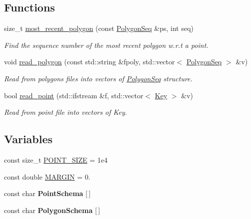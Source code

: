 \subsection*{Functions}
\begin{DoxyCompactItemize}
\item 
size\-\_\-t \hyperlink{namespaceSigSpatial2013_a317bfe5f97ff810889aab1765f916f49}{most\-\_\-recent\-\_\-polygon} (const \hyperlink{structSigSpatial2013_1_1PolygonSeq}{Polygon\-Seq} \&ps, int seq)
\begin{DoxyCompactList}\small\item\em Find the sequence number of the most recent polygon w.\-r.\-t a point. \end{DoxyCompactList}\item 
void \hyperlink{namespaceSigSpatial2013_ae6c95a87661a6bfca2decf6e7120508d}{read\-\_\-polygon} (const std\-::string \&fpoly, std\-::vector$<$ \hyperlink{structSigSpatial2013_1_1PolygonSeq}{Polygon\-Seq} $>$ \&v)
\begin{DoxyCompactList}\small\item\em Read from polygons files into vectors of \hyperlink{structSigSpatial2013_1_1PolygonSeq}{Polygon\-Seq} structure. \end{DoxyCompactList}\item 
\hypertarget{namespaceSigSpatial2013_abe57a3ac7481f0bf62658917a4d0642e}{bool \hyperlink{namespaceSigSpatial2013_abe57a3ac7481f0bf62658917a4d0642e}{read\-\_\-point} (std\-::ifstream \&f, std\-::vector$<$ \hyperlink{namespaceSigSpatial2013_af9823bd0b551eb301830d664ba571a15}{Key} $>$ \&v)}\label{namespaceSigSpatial2013_abe57a3ac7481f0bf62658917a4d0642e}

\begin{DoxyCompactList}\small\item\em Read from point file into vectors of Key. \end{DoxyCompactList}\end{DoxyCompactItemize}
\subsection*{Variables}
\begin{DoxyCompactItemize}
\item 
const size\-\_\-t \hyperlink{namespaceSigSpatial2013_a1d63766b99e35a7acbb9e1bffbcc9057}{P\-O\-I\-N\-T\-\_\-\-S\-I\-Z\-E} = 1e4
\item 
const double \hyperlink{namespaceSigSpatial2013_aea5a48169353413e1f56a7e3f3f70a96}{M\-A\-R\-G\-I\-N} = 0.
\item 
const char {\bfseries Point\-Schema} \mbox{[}$\,$\mbox{]}
\item 
const char {\bfseries Polygon\-Schema} \mbox{[}$\,$\mbox{]}
\end{DoxyCompactItemize}


